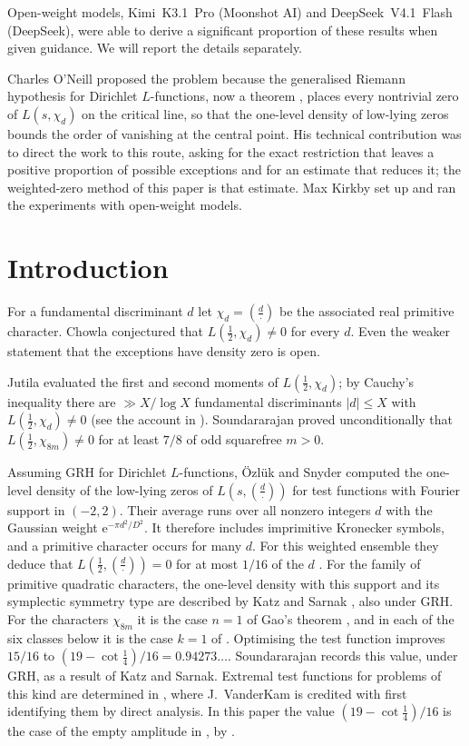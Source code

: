 \documentclass[11pt,colorlinks]{charlie}
\newcommand{\e}{\mathrm{e}}
\begin{document}
Open-weight models, Kimi~K3.1~Pro (Moonshot AI) and DeepSeek~V4.1~Flash (DeepSeek), were able to derive a significant proportion of these results when given guidance. We will report the details separately.

Charles O'Neill proposed the problem because the generalised Riemann hypothesis for Dirichlet $L$-functions, now a theorem \cite{Alpoge}, places every nontrivial zero of $L(s,\chi_d)$ on the critical line, so that the one-level density of low-lying zeros bounds the order of vanishing at the central point. His technical contribution was to direct the work to this route, asking for the exact restriction that leaves a positive proportion of possible exceptions and for an estimate that reduces it; the weighted-zero method of this paper is that estimate. Max Kirkby set up and ran the experiments with open-weight models. \responsibilitystatement

\section{Introduction}\label{sec:intro}
For a fundamental discriminant $d$ let $\chi_d=(\tfrac{d}{\cdot})$ be the associated real primitive character. Chowla conjectured that $L(\tfrac12,\chi_d)\ne0$ for every $d$. Even the weaker statement that the exceptions have density zero is open.

Jutila \cite{Jutila} evaluated the first and second moments of $L(\tfrac12,\chi_d)$; by Cauchy's inequality there are $\gg X/\log X$ fundamental discriminants $|d|\le X$ with $L(\tfrac12,\chi_d)\neq0$ (see the account in \cite[\S1]{Sound}). Soundararajan \cite[Theorem~1]{Sound} proved unconditionally that $L(\tfrac12,\chi_{8m})\neq0$ for at least $7/8$ of odd squarefree $m>0$.

Assuming GRH for Dirichlet $L$-functions, \"Ozl\"uk and Snyder \cite{OS} computed the one-level density of the low-lying zeros of $L(s,(\tfrac d\cdot))$ for test functions with Fourier support in $(-2,2)$. Their average runs over all nonzero integers $d$ with the Gaussian weight $\e^{-\pi d^2/D^2}$. It therefore includes imprimitive Kronecker symbols, and a primitive character occurs for many $d$. For this weighted ensemble they deduce that $L(\tfrac12,(\tfrac d\cdot))=0$ for at most $1/16$ of the $d$ \cite[Corollary~3 and the remark following it]{OS}. For the family of primitive quadratic characters, the one-level density with this support and its symplectic symmetry type are described by Katz and Sarnak \cite[\S4, family~I]{KaS}, also under GRH. For the characters $\chi_{8m}$ it is the case $n=1$ of Gao's theorem \cite{Gao}, and in each of the six classes below it is the case $k=1$ of . Optimising the test function improves $15/16$ to $(19-\cot\tfrac14)/16=0.94273\ldots$. Soundararajan \cite[\S1]{Sound} records this value, under GRH, as a result of Katz and Sarnak. Extremal test functions for problems of this kind are determined in \cite[Appendix~A]{ILS}, where J.~VanderKam is credited with first identifying them by direct analysis. In this paper the value $(19-\cot\tfrac14)/16$ is the case of the empty amplitude in , by .
\end{document}
